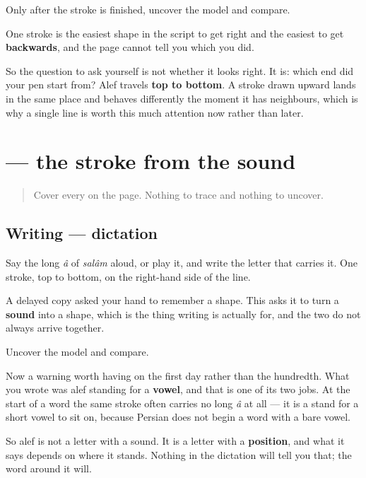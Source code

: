 Only after the stroke is finished, uncover the model and compare.

\begin{tcolorbox}[breakable,colback=teal!4,colframe=teal!35!black,title={Before you move on}]
One stroke is the easiest shape in the script to get right and the easiest to get \textbf{backwards}, and the page cannot tell you which you did.

So the question to ask yourself is not whether it looks right. It is: which end did your pen start from? Alef travels \textbf{top to bottom}. A stroke drawn upward lands in the same place and behaves differently the moment it has neighbours, which is why a single line is worth this much attention now rather than later.
\end{tcolorbox}
\section[\texorpdfstring{\fa{ا} (alef)}{ا (alef)}]{ — the stroke from the sound}

\label{lesson:FA-W00-alef-dictation}



\begin{quote}
Cover every \textbf{} on the page. Nothing to trace and nothing to uncover.
\end{quote}

\subsection*{Writing — dictation}
Say the long \emph{â} of \emph{salâm} aloud, or play it, and write the letter that carries it. One stroke, top to bottom, on the right-hand side of the line.

A delayed copy asked your hand to remember a shape. This asks it to turn a \textbf{sound} into a shape, which is the thing writing is actually for, and the two do not always arrive together.

\begin{tcolorbox}[breakable,colback=teal!4,colframe=teal!35!black,title={Before you move on}]
Uncover the model and compare.

Now a warning worth having on the first day rather than the hundredth. What you wrote was alef standing for a \textbf{vowel}, and that is one of its two jobs. At the start of a word the same stroke often carries no long \emph{â} at all — it is a stand for a short vowel to sit on, because Persian does not begin a word with a bare vowel.

So alef is not a letter with a sound. It is a letter with a \textbf{position}, and what it says depends on where it stands. Nothing in the dictation will tell you that; the word around it will.
\end{tcolorbox}
